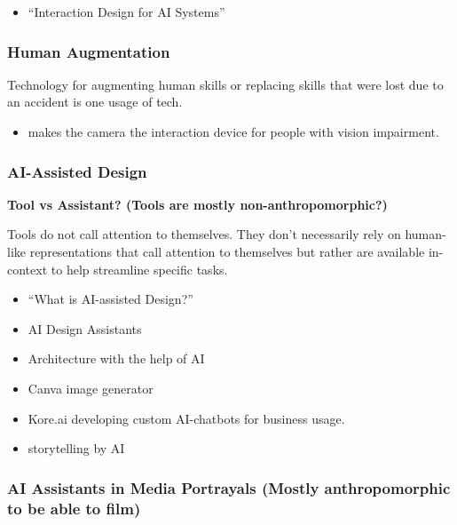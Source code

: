 \documentclass[
  letterpaper,
  DIV=11,
  numbers=noendperiod]{scrartcl}
\providecommand{\tightlist}{%
  \setlength{\itemsep}{0pt}\setlength{\parskip}{0pt}}\usepackage{longtable,booktabs,array}
\begin{document}
\begin{itemize}
\tightlist
\item
  \citep{costaInteractionDesignAI2022} ``Interaction Design for AI
  Systems''
\end{itemize}

\subsubsection{Human Augmentation}\label{human-augmentation}

Technology for augmenting human skills or replacing skills that were
lost due to an accident is one usage of tech.

\begin{itemize}
\tightlist
\item
  \citep{dotgoDotGo2023} makes the camera the interaction device for
  people with vision impairment.
\end{itemize}

\subsubsection{AI-Assisted Design}\label{ai-assisted-design}

\textbf{Tool vs Assistant? (Tools are mostly non-anthropomorphic?)}

Tools do not call attention to themselves. They don't necessarily rely
on human-like representations that call attention to themselves but
rather are available in-context to help streamline specific tasks.

\begin{itemize}
\tightlist
\item
  \citet{september162020WhatAIassistedDesign2020} ``What is AI-assisted
  Design?''
\item
  \citet{clipdropCreateStunningVisuals} AI Design Assistants
\item
  \citet{architechturesWhatArtificialIntelligence2020} Architecture with
  the help of AI
\item
  \citet{zakariyaStopUsingJasper2022} Canva image generator
\item
  \citet{kore.aiHomepage2023} Kore.ai developing custom AI-chatbots for
  business usage.
\item
  \citet{CharismaStorytellingPowered} storytelling by AI
\end{itemize}

\subsubsection{AI Assistants in Media Portrayals (Mostly anthropomorphic
to be able to
film)}\label{ai-assistants-in-media-portrayals-mostly-anthropomorphic-to-be-able-to-film}
\end{document}

